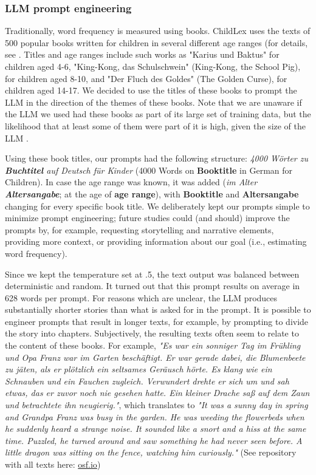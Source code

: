 \documentclass[doc, a4paper, anonymous]{apa7}
\begin{document}
\subsubsection*{LLM prompt engineering}

Traditionally, word frequency is measured using books. ChildLex uses the texts of 500 popular books written for children in several different age ranges (for details, see \citep{schroeder_childlex_2015}. Titles and age ranges include such works as "Karius und Baktus" for children aged 4-6, "King-Kong, das Schulschwein" (King-Kong, the School Pig), for children aged 8-10, and "Der Fluch des Goldes" (The Golden Curse), for children aged 14-17. We decided to use the titles of these books to prompt the LLM in the direction of the themes of these books. Note that we are unaware if the LLM we used had these books as part of its large set of training data, but the likelihood that at least some of them were part of it is high, given the size of the LLM \citep{liu_datasets_2024}.  
 
Using these book titles, our prompts had the following structure: \textit{4000 Wörter zu \textbf{Buchtitel} auf Deutsch für Kinder} (4000 Words on \textbf{Booktitle} in German for Children). In case the age range was known, it was added (\textit{im Alter \textbf{Altersangabe}}; at the age of \textbf{age range}), with \textbf{Booktitle} and \textbf{Altersangabe} changing for every specific book title. We deliberately kept our prompts simple to minimize prompt engineering; future studies could (and should) improve the prompts by, for example, requesting storytelling and narrative elements, providing more context, or providing information about our goal (i.e., estimating word frequency). 

Since we kept the temperature set at .5, the text output was balanced between deterministic and random. It turned out that this prompt results on average in 628 words per prompt. For reasons which are unclear, the LLM produces substantially shorter stories than what is asked for in the prompt. It is possible to engineer prompts that result in longer texts, for example, by prompting to divide the story into chapters. Subjectively, the resulting texts often seem to relate to the content of these books. For example, \textit{"Es war ein sonniger Tag im Frühling und Opa Franz war im Garten beschäftigt. Er war gerade dabei, die Blumenbeete zu jäten, als er plötzlich ein seltsames Geräusch hörte. Es klang wie ein Schnauben und ein Fauchen zugleich. Verwundert drehte er sich um und sah etwas, das er zuvor noch nie gesehen hatte. Ein kleiner Drache saß auf dem Zaun und betrachtete ihn neugierig."}, which translates to \textit{"It was a sunny day in spring and Grandpa Franz was busy in the garden. He was weeding the flowerbeds when he suddenly heard a strange noise. It sounded like a snort and a hiss at the same time. Puzzled, he turned around and saw something he had never seen before. A little dragon was sitting on the fence, watching him curiously."} (See repository with all texts here: \href{dx.doi.org/10.17605/OSF.IO/WMUVJ}{osf.io})
\end{document}
